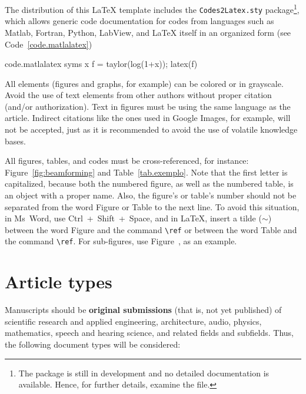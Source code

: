 \documentclass[12pt, a4paper, twoside, twocolumn]{article}
\begin{document}
The distribution of this \LaTeX\xspace template includes the \texttt{Codes2Latex.sty} package\footnote{The package is still in development and no detailed documentation is available. Hence, for further details, examine the  file.}, which allows generic code documentation for codes from languages such as Matlab, Fortran, Python, LabView, and \LaTeX{} itself in an organized form (see Code~\ref{code.matlalatex})

\begin{matlabcode}{code.matlalatex}
  syms x
  f = taylor(log(1+x));
  latex(f)
\end{matlabcode}

All elements (figures and graphs, for example) can be colored or in grayscale. Avoid the use of text elements from other authors without proper citation (and/or authorization). Text in figures must be using the same language as the article. Indirect citations like the ones used in Google Images, for example, will not be accepted, just as it is recommended to avoid the use of volatile knowledge bases.

All figures, tables, and codes must be cross-referenced, for instance: Figure~\ref{fig:beamforming} and Table~\ref{tab.exemplo}. Note that the first letter is capitalized, because both the numbered figure, as well as the numbered table, is an object with a proper name. Also, the figure's or table's number should not be separated from the word Figure or Table to the next line. To avoid this situation, in Ms~Word, use Ctrl~+~Shift~+~Space, and in \LaTeX, insert a tilde ($\sim$) between the word Figure and the command \verb=\ref= or between the word Table and the command \verb=\ref=.
%
For sub-figures, use Figure~, as an example.

\section{Article types}

Manuscripts should be \textbf{original submissions} (that is, not yet published) of scientific research and applied engineering, architecture, audio, physics, mathematics, speech and hearing science, and related fields and subfields. Thus, the following document types will be considered:
\end{document}
